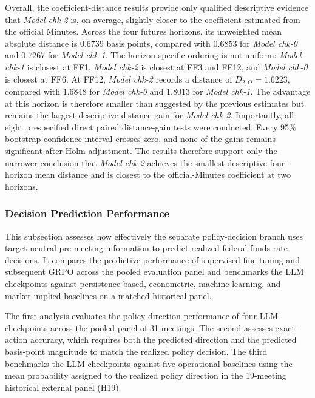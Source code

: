 Overall, the coefficient-distance results provide only qualified descriptive
evidence that \textit{Model chk-2} is, on average, slightly closer to the
coefficient estimated from the official Minutes. Across the four futures
horizons, its unweighted mean absolute distance is \(0.6739\) basis points,
compared with \(0.6853\) for \textit{Model chk-0} and \(0.7267\) for
\textit{Model chk-1}. The horizon-specific ordering is not uniform:
\textit{Model chk-1} is closest at FF1, \textit{Model chk-2} is closest at FF3
and FF12, and \textit{Model chk-0} is closest at FF6. At FF12,
\textit{Model chk-2} records a distance of \(D_{2,O}=1.6223\), compared with
\(1.6848\) for \textit{Model chk-0} and \(1.8013\) for
\textit{Model chk-1}. The advantage at this horizon is therefore smaller than
suggested by the previous estimates but remains the largest descriptive
distance gain for \textit{Model chk-2}. Importantly, all eight prespecified
direct paired distance-gain tests were conducted. Every 95\% bootstrap
confidence interval crosses zero, and none of the gains remains significant
after Holm adjustment. The results therefore support only the narrower
conclusion that \textit{Model chk-2} achieves the smallest descriptive
four-horizon mean distance and is closest to the official-Minutes coefficient
at two horizons.





\subsubsection*{Decision Prediction Performance}

This subsection assesses how effectively the separate policy-decision branch uses target-neutral pre-meeting information to predict realized federal funds rate decisions. It compares the predictive performance of supervised fine-tuning and subsequent GRPO across the pooled evaluation panel and benchmarks the LLM checkpoints against persistence-based, econometric, machine-learning, and market-implied baselines on a matched historical panel.


The first analysis evaluates the policy-direction performance of four LLM checkpoints across the pooled panel of 31 meetings. The second assesses exact-action accuracy, which requires both the predicted direction and the predicted basis-point magnitude to match the realized policy decision. The third benchmarks the LLM checkpoints against five operational baselines using the mean probability assigned to the realized policy direction in the 19-meeting historical external panel (H19).


